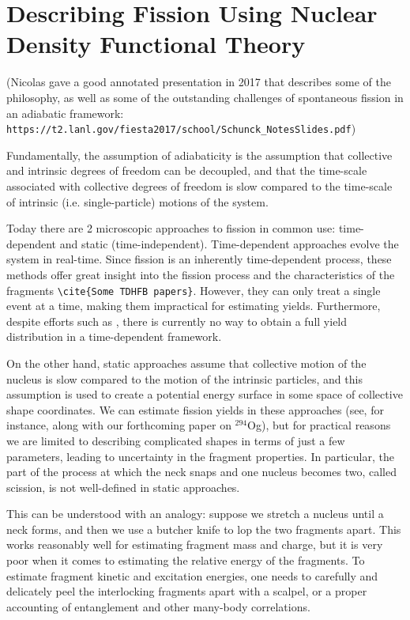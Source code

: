 \chapter{Describing Fission Using Nuclear Density Functional Theory}\label{chap:Model}
\maketitle

(Nicolas gave a good annotated presentation in 2017 that describes some of the philosophy, as well as some of the outstanding challenges of spontaneous fission in an adiabatic framework: \verb|https://t2.lanl.gov/fiesta2017/school/Schunck_NotesSlides.pdf|)

Fundamentally, the assumption of adiabaticity is the assumption that collective and intrinsic degrees of freedom can be decoupled, and that the time-scale associated with collective degrees of freedom is slow compared to the time-scale of intrinsic (i.e. single-particle) motions of the system.

Today there are 2 microscopic approaches to fission in common use: time-dependent and static (time-independent). Time-dependent approaches evolve the system in real-time. Since fission is an inherently time-dependent process, these methods offer great insight into the fission process and the characteristics of the fragments \verb|\cite{Some TDHFB papers}|. However, they can only treat a single event at a time, making them impractical for estimating yields. Furthermore, despite efforts such as \cite{Bulgac2018}, there is currently no way to obtain a full yield distribution in a time-dependent framework.

On the other hand, static approaches assume that collective motion of the nucleus is slow compared to the motion of the intrinsic particles, and this assumption is used to create a potential energy surface in some space of collective shape coordinates. We can estimate fission yields in these approaches (see, for instance, \cite{Sadhukhan2016} along with our forthcoming paper on $^{294}$Og), but for practical reasons we are limited to describing complicated shapes in terms of just a few parameters, leading to uncertainty in the fragment properties. In particular, the part of the process at which the neck snaps and one nucleus becomes two, called scission, is not well-defined in static approaches.

This can be understood with an analogy: suppose we stretch a nucleus until a neck forms, and then we use a butcher knife to lop the two fragments apart. This works reasonably well for estimating fragment mass and charge, but it is very poor when it comes to estimating the relative energy of the fragments. To estimate fragment kinetic and excitation energies, one needs to carefully and delicately peel the interlocking fragments apart with a scalpel, or a proper accounting of entanglement and other many-body correlations.

